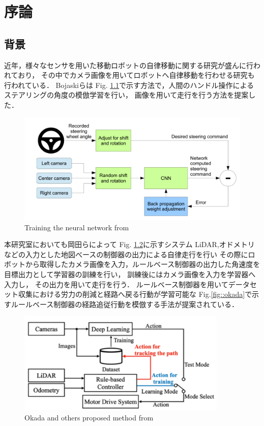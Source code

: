 \chapter{序論}
\section{背景}
近年，様々なセンサを用いた移動ロボットの自律移動に関する研究が盛んに行われており，
その中でカメラ画像を用いてロボットへ自律移動を行わせる研究も行われている．
Bojaskiら\cite{Nvidia}は
Fig. \ref{fig::nvidia}で示す方法で，人間のハンドル操作によるステアリングの角度の模倣学習を行い，
画像を用いて走行を行う方法を提案した．

\begin{figure}[h]
    \centering
    \includegraphics[width = 13cm]{./figs/EndtoEnd_Learning_for_Self-Driving_Cars.pdf}
    \caption{Training the neural network from \cite{Nvidia}}
    \label{fig::nvidia}
\end{figure}

\newpage
本研究室においても岡田ら\cite{okada}によって
Fig. \ref{fig::okada_sys}に示すシステム
LiDAR,オドメトリなどの入力とした地図べースの制御器の出力による自律走行を行い
その際にロボットから取得したカメラ画像を入力，ルールベース制御器の出力した角速度を目標出力として学習器の訓練を行い，
訓練後にはカメラ画像を入力を学習器へ入力し，
その出力を用いて走行を行う．
ルールベース制御器を用いてデータセット収集における労力の削減と経路へ戻る行動が学習可能な
Fig.\ref{fig::okada}で示すルールベース制御器の経路追従行動を模倣する手法が提案されている．
\begin{figure}[h]
    \centering
    \includegraphics[width = 10cm]{./figs/okada_sys.png}
    \caption{Okada and others proposed method from \cite{okada}}
    \label{fig::okada_sys}
\end{figure}

